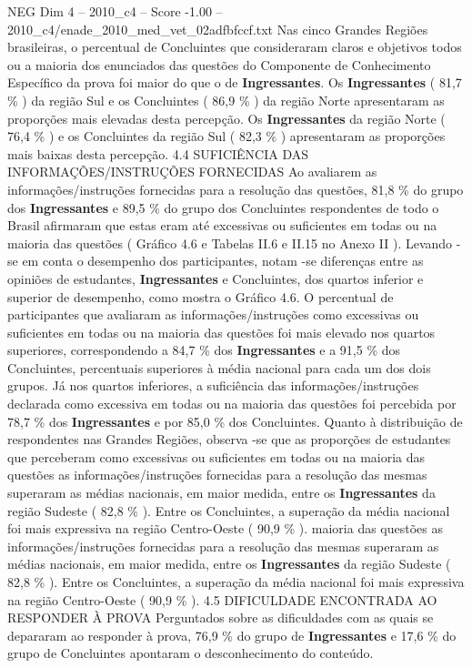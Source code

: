 \begin{textsample}{NEG Dim 4 – 2010\_c4 – Score -1.00 – 2010\_c4/enade\_2010\_med\_vet\_02adfbfccf.txt}
Nas cinco Grandes Regiões brasileiras, o percentual de Concluintes que consideraram claros e objetivos todos ou a maioria dos enunciados das questões do Componente de Conhecimento Específico da prova foi maior do que o de \textbf{Ingressantes}.
Os \textbf{Ingressantes} ( 81,7 \% ) da região Sul e os Concluintes ( 86,9 \% ) da região Norte apresentaram as proporções mais elevadas desta percepção.
Os \textbf{Ingressantes} da região Norte ( 76,4 \% ) e os Concluintes da região Sul ( 82,3 \% ) apresentaram as proporções mais baixas desta percepção. 4.4 SUFICIÊNCIA DAS INFORMAÇÕES/INSTRUÇÕES FORNECIDAS Ao avaliarem as informações/instruções fornecidas para a resolução das questões, 81,8 \% do grupo dos \textbf{Ingressantes} e 89,5 \% do grupo dos Concluintes respondentes de todo o Brasil afirmaram que estas eram até excessivas ou suficientes em todas ou na maioria das questões ( Gráfico 4.6 e Tabelas II.6 e II.15 no Anexo II ).
Levando -se em conta o desempenho dos participantes, notam -se diferenças entre as opiniões de estudantes, \textbf{Ingressantes} e Concluintes, dos quartos inferior e superior de desempenho, como mostra o Gráfico 4.6.
O percentual de participantes que avaliaram as informações/instruções como excessivas ou suficientes em todas ou na maioria das questões foi mais elevado nos quartos superiores, correspondendo a 84,7 \% dos \textbf{Ingressantes} e a 91,5 \% dos Concluintes, percentuais superiores à média nacional para cada um dos dois grupos.
Já nos quartos inferiores, a suficiência das informações/instruções declarada como excessiva em todas ou na maioria das questões foi percebida por 78,7 \% dos \textbf{Ingressantes} e por 85,0 \% dos Concluintes.
Quanto à distribuição de respondentes nas Grandes Regiões, observa -se que as proporções de estudantes que perceberam como excessivas ou suficientes em todas ou na maioria das questões as informações/instruções fornecidas para a resolução das mesmas superaram as médias nacionais, em maior medida, entre os \textbf{Ingressantes} da região Sudeste ( 82,8 \% ).
Entre os Concluintes, a superação da média nacional foi mais expressiva na região Centro-Oeste ( 90,9 \% ). maioria das questões as informações/instruções fornecidas para a resolução das mesmas superaram as médias nacionais, em maior medida, entre os \textbf{Ingressantes} da região Sudeste ( 82,8 \% ).
Entre os Concluintes, a superação da média nacional foi mais expressiva na região Centro-Oeste ( 90,9 \% ). 4.5 DIFICULDADE ENCONTRADA AO RESPONDER À PROVA Perguntados sobre as dificuldades com as quais se depararam ao responder à prova, 76,9 \% do grupo de \textbf{Ingressantes} e 17,6 \% do grupo de Concluintes apontaram o desconhecimento do conteúdo.

\end{textsample}
